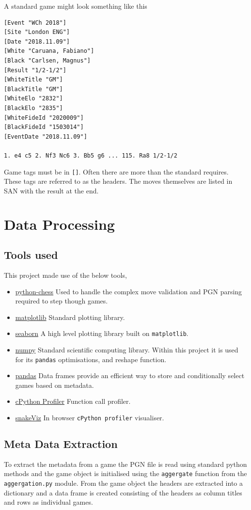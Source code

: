 \documentclass[11pt]{article}
\begin{document}
A standard game might look something like this
\begin{verbatim}
[Event "WCh 2018"]
[Site "London ENG"]
[Date "2018.11.09"]
[White "Caruana, Fabiano"]
[Black "Carlsen, Magnus"]
[Result "1/2-1/2"]
[WhiteTitle "GM"]
[BlackTitle "GM"]
[WhiteElo "2832"]
[BlackElo "2835"]
[WhiteFideId "2020009"]
[BlackFideId "1503014"]
[EventDate "2018.11.09"]

1. e4 c5 2. Nf3 Nc6 3. Bb5 g6 ... 115. Ra8 1/2-1/2
\end{verbatim}
Game tags must be in \texttt{[]}. Often there are more than the standard requires. These tags are referred to as the headers. The moves themselves are listed in SAN with the result at the end.
\section{Data Processing}
\label{sec:org09de8f2}
\subsection{Tools used}
\label{sec:orgf57b4a6}
This project made use of the below tools,
\begin{itemize}
\item \href{https://github.com/niklasf/python-chess}{python-chess}
Used to handle the complex move validation and PGN parsing required to step though games.
\item \href{https://matplotlib.org/}{matplotlib}
Standard plotting library.
\item \href{https://seaborn.pydata.org/}{seaborn}
A high level plotting library built on \texttt{matplotlib}.
\item \href{https://numpy.org/}{numpy}
Standard scientific computing library. Within this project it is used for its \texttt{pandas} optimisations, and reshape function.
\item \href{https://pandas.pydata.org/}{pandas}
Data frames provide an efficient way to store and conditionally select games based on metadata.
\item \href{https://github.com/python/cpython}{cPython Profiler}
Function call profiler.
\item \href{https://jiffyclub.github.io/snakeviz/}{snakeViz}
In browser \texttt{cPython profiler} visualiser.
\end{itemize}

\subsection{Meta Data Extraction}
\label{sec:org9f3c667}
To extract the metadata from a game the PGN file is read using standard python methods and the game object is initialised using the \texttt{aggergate} function from the \texttt{aggergation.py} module. From the game object the headers are extracted into a dictionary and a data frame is created consisting of the headers as column titles and rows as individual games.
\end{document}
